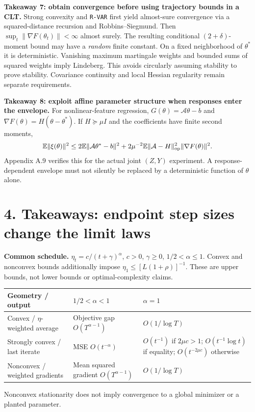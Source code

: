 \documentclass[11pt]{article}
\newcommand{\E}{\mathbb E}\newcommand{\R}{\mathbb R}\newcommand{\C}{\mathbb C}
\newcommand{\norm}[1]{\lVert#1\rVert}
\newcommand{\ID}[1]{\texttt{#1}}
\begin{document}
\textbf{Takeaway 7: obtain convergence before using trajectory bounds in a CLT.}
Strong convexity and \ID{R-VAR} first yield almost-sure convergence via a squared-distance recursion and Robbins--Siegmund. Then $\sup_t\norm{\nabla F(\theta_t)}<\infty$ almost surely.
The resulting conditional $(2+\delta)$-moment bound may have a \emph{random} finite constant. On a fixed neighborhood of $\theta^*$ it is deterministic.
Vanishing maximum martingale weights and bounded sums of squared weights imply Lindeberg. This avoids circularly assuming stability to prove stability. Covariance continuity and local Hessian regularity remain separate requirements.

\textbf{Takeaway 8: exploit affine parameter structure when responses enter the envelope.}
For nonlinear-feature regression, $G(\theta)=\mathcal A\theta-b$ and $\nabla F(\theta)=H(\theta-\theta^*)$. If $H\succeq\mu I$ and the coefficients have finite second moments,
\[
\E\norm{\xi(\theta)}^2
\le 2\E\norm{\mathcal A\theta^*-b}^2
+2\mu^{-2}\E\norm{\mathcal A-H}_{\rm op}^2\norm{\nabla F(\theta)}^2.
\]
Appendix A.9 verifies this for the actual joint $(Z,Y)$ experiment. A response-dependent envelope must not silently be replaced by a deterministic function of $\theta$ alone.

\clearpage
\section*{4. Takeaways: endpoint step sizes change the limit laws}
\textbf{Common schedule.} $\eta_t=c/(t+\gamma)^\alpha$, $c>0$, $\gamma\ge0$, $1/2<\alpha\le1$.
Convex and nonconvex bounds additionally impose $\eta_1\le[L(1+\rho)]^{-1}$.
These are upper bounds, not lower bounds or optimal-complexity claims.

\small
\begin{tabular}{>{\raggedright\arraybackslash}p{.24\linewidth}>{\raggedright\arraybackslash}p{.28\linewidth}>{\raggedright\arraybackslash}p{.38\linewidth}}
\toprule Geometry / output & $1/2<\alpha<1$ & $\alpha=1$ \\\midrule
Convex / $\eta$-weighted average & Objective gap $O(T^{\alpha-1})$ & $O(1/\log T)$ \\
Strongly convex / last iterate & MSE $O(t^{-\alpha})$ & $O(t^{-1})$ if $2\mu c>1$; $O(t^{-1}\log t)$ if equality; $O(t^{-2\mu c})$ otherwise \\
Nonconvex / weighted gradients & Mean squared gradient $O(T^{\alpha-1})$ & $O(1/\log T)$ \\
\bottomrule
\end{tabular}
\normalsize
Nonconvex stationarity does not imply convergence to a global minimizer or a planted parameter.
\end{document}
